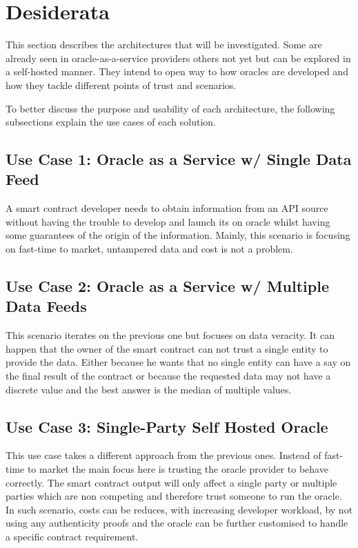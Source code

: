 \section{Desiderata}

This section describes the architectures that will be investigated. Some are already seen in oracle-as-a-service providers others not yet but can be explored in a self-hosted manner. They intend to open way to how oracles are developed and how they tackle different points of trust and scenarios.

To better discuss the purpose and usability of each architecture, the following subsections explain the use cases of each solution.

\subsection{Use Case 1: Oracle as a Service w/ Single Data Feed}

A smart contract developer needs to obtain information from an API source without having the trouble to develop and launch its on oracle whilst having some guarantees of the origin of the information. Mainly, this scenario is focusing on fast-time to market, untampered data and cost is not a problem.

\subsection{Use Case 2: Oracle as a Service w/ Multiple Data Feeds}

This scenario iterates on the previous one but focuses on data veracity. It can happen that the owner of the smart contract can not trust a single entity to provide the data. Either because he wants that no single entity can have a say on the final result of the contract or because the requested data may not have a discrete value and the best answer is the median of multiple values.

\subsection{Use Case 3: Single-Party Self Hosted Oracle}

This use case takes a different approach from the previous ones. Instead of fast-time to market the main focus here is trusting the oracle provider to behave correctly. The smart contract output will only affect a single party or multiple parties which are non competing and therefore trust someone to run the oracle. In such scenario, costs can be reduces, with increasing developer workload, by not using any authenticity proofs and the oracle can be further customised to handle a specific contract requirement.

